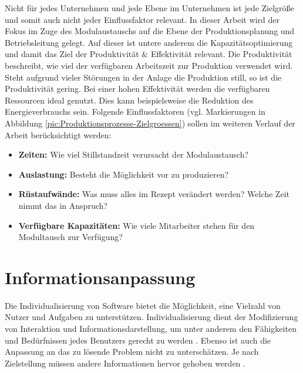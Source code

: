 Nicht für jedes Unternehmen und jede Ebene im Unternehmen ist jede Zielgröße und somit auch nicht jeder Einflussfaktor relevant. In dieser Arbeit wird der Fokus im Zuge des Modulaustauschs auf die Ebene der Produktionsplanung und Betriebsleitung gelegt. Auf dieser ist untere anderem die Kapazitätsoptimierung und damit das Ziel der Produktivität \& Effektivität relevant. Die Produktivität beschreibt, wie viel der verfügbaren Arbeitszeit zur Produktion verwendet wird. Steht aufgrund vieler Störungen in der Anlage die Produktion still, so ist die Produktivität gering. Bei einer hohen Effektivität werden die verfügbaren Ressourcen ideal genutzt. Dies kann beispielsweise die Reduktion des Energieverbrauchs sein. Folgende Einflussfaktoren (vgl. Markierungen in Abbildung \ref{pic:Produktionsprozesse-Zielgroessen}) sollen im weiteren Verlauf der Arbeit berücksichtigt werden:
\begin{itemize}
\item \textbf{Zeiten:} Wie viel Stillstandzeit verursacht der Modulaustausch?
\item \textbf{Auslastung:} Besteht die Möglichkeit vor zu produzieren?
\item \textbf{Rüstaufwände:} Was muss alles im Rezept verändert werden? Welche Zeit nimmt das in Anspruch?
\item \textbf{Verfügbare Kapazitäten:} Wie viele Mitarbeiter stehen für den Modultausch zur Verfügung? 
\end{itemize}

\section{Informationsanpassung}
Die Individualisierung von Software bietet die Möglichkeit, eine Vielzahl von Nutzer und Aufgaben zu unterstützen. Individualisierung dient der Modifizierung von Interaktion und Informationsdarstellung, um unter anderem den Fähigkeiten und Bedürfnissen jedes Benutzers gerecht zu werden \cite{Heinecke2012}. Ebenso ist auch die Anpassung an das zu lösende Problem nicht zu unterschätzen. Je nach Zielstellung müssen andere Informationen hervor gehoben werden \cite{Funke2015}.

